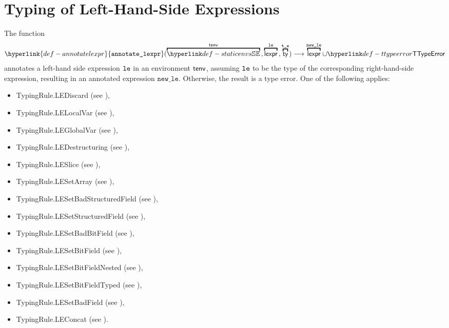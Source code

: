 \documentclass{book}
\newcommand\annotatelexpr[1]{\hyperlink{def-annotatelexpr}{\texttt{annotate\_lexpr}}(#1)}
\newcommand\vte[0]{\texttt{t\_e}}
\newcommand\newle[0]{\texttt{new\_le}}
\begin{document}
\chapter{Typing of Left-Hand-Side Expressions}
\hypertarget{def-annotatelexpr}{}
The function
\[
  \annotatelexpr{
    \overname{\staticenvs}{\tenv} \aslsep
    \overname{\lexpr}{\vle} \aslsep
    \overname{\ty}{\vte}} \aslto
    \overname{\lexpr}{\newle} \cup \TTypeError
\]
annotates a left-hand side expression $\texttt{le}$ in an environment $\textsf{tenv}$, assuming $\texttt{le}$
to be the type of the corresponding right-hand-side expression,
resulting in an annotated expression $\newle$.
Otherwise, the result is a type error.
One of the following applies:
\begin{itemize}
\item TypingRule.LEDiscard (see ),
\item TypingRule.LELocalVar (see ),
\item TypingRule.LEGlobalVar (see ),
\item TypingRule.LEDestructuring (see ),
\item TypingRule.LESlice (see ),
\item TypingRule.LESetArray (see ),
\item TypingRule.LESetBadStructuredField (see ),
\item TypingRule.LESetStructuredField (see ),
\item TypingRule.LESetBadBitField (see ),
\item TypingRule.LESetBitField (see ),
\item TypingRule.LESetBitFieldNested (see ),
\item TypingRule.LESetBitFieldTyped (see ),
\item TypingRule.LESetBadField (see ),
\item TypingRule.LEConcat (see ).
\end{itemize}
\end{document}
